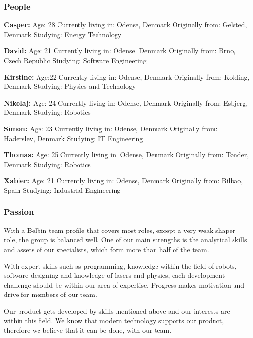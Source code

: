 \subsubsection{People}

\textbf{Casper:}
Age: 28
Currently living in: Odense, Denmark
Originally from: Gelsted, Denmark
Studying: Energy Technology

\textbf{David:}
Age: 21
Currently living in: Odense, Denmark
Originally from: Brno, Czech Republic
Studying: Software Engineering

\textbf{Kirstine:}
Age:22
Currently living in: Odense, Denmark
Originally from: Kolding, Denmark
Studying: Physics and Technology

\textbf{Nikolaj:}
Age: 24
Currently living in: Odense, Denmark
Originally from: Esbjerg, Denmark
Studying: Robotics

\textbf{Simon:}
Age: 23
Currently living in: Odense, Denmark
Originally from: Haderslev, Denmark
Studying: IT Engineering

\textbf{Thomas:}
Age: 25
Currently living in: Odense, Denmark
Originally from: Tønder, Denmark
Studying: Robotics

\textbf{Xabier:}
Age: 21
Currently living in: Odense, Denmark
Originally from: Bilbao, Spain
Studying: Industrial Engineering

\subsubsection{Passion}
With a Belbin team profile that covers most roles, except a very weak shaper role, the group is balanced well. One of our main strengths is the analytical skills and assets of our specialists, which form more than half of the team.  

With expert skills such as programming, knowledge within the field of robots, software designing and knowledge of lasers and physics, each development challenge should be within our area of expertise. Progress makes motivation and drive for members of our team. 

Our product gets developed by skills mentioned above and our interests are within this field. We know that modern technology supports our product, therefore we believe that it can be done, with our team. 
